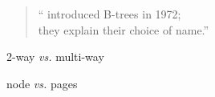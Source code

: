 
\begin{frame}{}

  \pause
  \vspace{0.60cm}
  \begin{quote}
    \centering
    `` introduced B-trees in 1972; \\[5pt]
    they  explain their choice of name.''
  \end{quote}
\end{frame}


\begin{frame}{}

  \vspace{0.60cm}
  \begin{center}
    2-way \emph{vs.} multi-way
  \end{center}
\end{frame}

\begin{frame}{}

  \vspace{0.60cm}
  \begin{center}
    node \emph{vs.} pages
  \end{center}
\end{frame}
